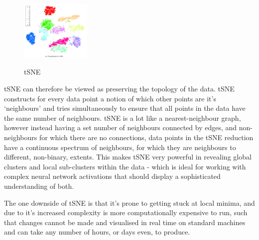 \documentclass[a4paper,11pt,titlepage]{article}
\begin{document}
	\begin{figure}[H]
    			\centering	
			{{\includegraphics[width=0.3\textwidth]
    				{img/hinton_tsne.png} 
    			}}%
    			\caption{tSNE}%
    		\label{fig:3nn}
	\end{figure}	  
	
	
		tSNE can therefore be viewed as preserving the topology of the data. tSNE constructs for every data point a notion of which other points are it's `neighbours' and tries simultaneously to ensure that all points in the data have the same number of neighbours. tSNE is a lot like a nearest-neighbour graph, however instead having a set number of neighbours connected by edges, and non-neighbours for which there are no connections, data points in the tSNE reduction have a continuous spectrum of neighbours, for which they are neighbours to different, non-binary, extents. This makes tSNE very powerful in revealing global clusters and local sub-clusters within the data - which is ideal for working with complex neural network activations that should display a sophisticated understanding of both.
		\par
		 The one downside of tSNE is that it's prone to getting stuck at local minima, and due to it's increased complexity is more computationally expensive to run, such that changes cannot be made and visualised in real time on standard machines and can take any number of hours, or days even, to produce.  
\end{document}
